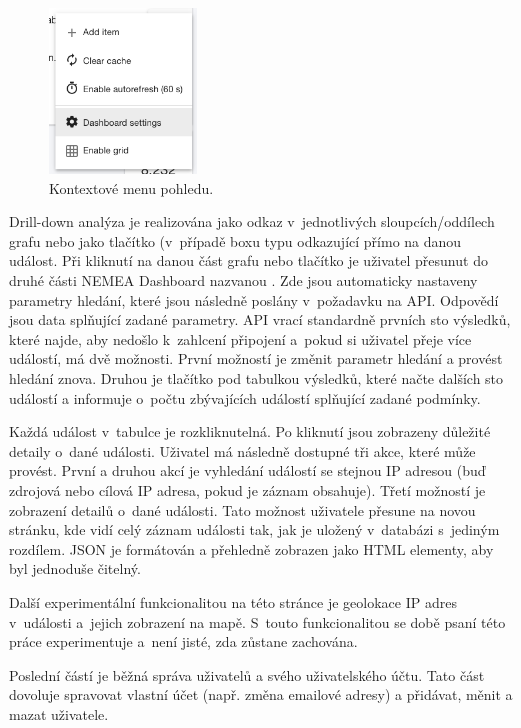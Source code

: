 \begin{figure}[ht]
    \centering
    \includegraphics[width=0.35\textwidth]{fig/dashboard_menu.png}
    \caption{Kontextové menu pohledu.} \label{fig:dashboard_menu}
\end{figure}

Drill-down analýza je realizována jako odkaz v~jednotlivých sloupcích/oddílech grafu nebo jako tlačítko (v~případě boxu typu  odkazující přímo na danou událost. Při kliknutí na danou část grafu nebo tlačítko je uživatel přesunut do druhé části NEMEA Dashboard nazvanou . Zde jsou automaticky nastaveny parametry hledání, které jsou následně poslány v~požadavku na API. Odpovědí jsou data splňující zadané parametry. API vrací standardně prvních sto výsledků, které najde, aby nedošlo k~zahlcení připojení a~pokud si uživatel přeje více událostí, má dvě možnosti. První možností je změnit parametr hledání a provést hledání znova. Druhou je tlačítko pod tabulkou výsledků, které načte dalších sto událostí a informuje o~počtu zbývajících událostí splňující zadané podmínky.

Každá událost v~tabulce je rozkliknutelná. Po kliknutí jsou zobrazeny důležité detaily o~dané události. Uživatel má následně dostupné tři akce, které může provést. První a druhou akcí je vyhledání událostí se stejnou IP adresou (buď zdrojová nebo cílová IP adresa, pokud je záznam obsahuje). Třetí možností je zobrazení detailů o~dané události. Tato možnost uživatele přesune na novou stránku, kde vidí celý záznam události tak, jak je uložený v~databázi s~jediným rozdílem. JSON je formátován a přehledně zobrazen jako HTML elementy, aby byl jednoduše čitelný.

Další experimentální funkcionalitou na této stránce je geolokace IP adres v~události a~jejich zobrazení na mapě. S~touto funkcionalitou se době psaní této práce experimentuje a~není jisté, zda zůstane zachována.

Poslední částí je běžná správa uživatelů a svého uživatelského účtu. Tato část dovoluje spravovat vlastní účet (např. změna emailové adresy) a přidávat, měnit a mazat uživatele.

